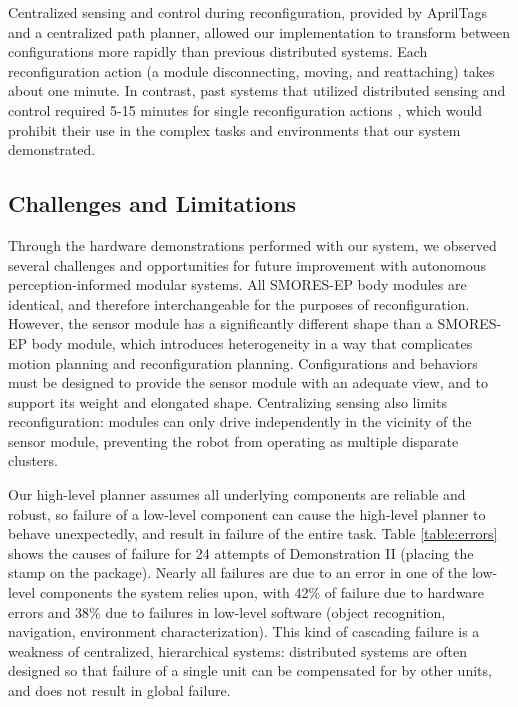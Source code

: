 \documentclass[12pt]{article}
\begin{document}
Centralized sensing and control during reconfiguration, provided by AprilTags and a centralized path planner, allowed our implementation to transform between configurations more rapidly than previous distributed systems. 
Each reconfiguration action (a module disconnecting, moving, and reattaching) takes about one minute.  In contrast, past systems that utilized distributed sensing and control required 5-15 minutes for single reconfiguration actions \cite{Yim2007, Rubenstein2004,Murata2006}, which would prohibit their use in the complex tasks and environments that our system demonstrated.


\subsection{Challenges and Limitations}
%

Through the hardware demonstrations performed with our system, we observed several challenges and opportunities for future improvement with autonomous perception-informed modular systems. All SMORES-EP body modules are identical, and therefore interchangeable for the purposes of reconfiguration.  However, the sensor module has a significantly different shape than a SMORES-EP body module, which introduces heterogeneity in a way that complicates motion planning and reconfiguration planning.  Configurations and behaviors must be designed to provide the sensor module with an adequate view, and to support its weight and elongated shape.  Centralizing sensing also limits reconfiguration: modules can only drive independently in the vicinity of the sensor module, preventing the robot from operating as multiple disparate clusters. 

Our high-level planner assumes all underlying components are reliable and robust, so failure of a low-level component can cause the high-level planner to behave unexpectedly, and result in failure of the entire task.  Table \ref{table:errors} shows the causes of failure for 24 attempts of Demonstration II (placing the stamp on the package).  
Nearly all failures are due to an error in one of the low-level components the system relies upon, with
42\% of failure due to hardware errors and 38\% due to failures in low-level software (object recognition, navigation, environment characterization).
This kind of cascading failure is a weakness of centralized, hierarchical systems: distributed systems are often designed so that failure of a single unit can be compensated for by other units, and does not result in global failure.
\end{document}
